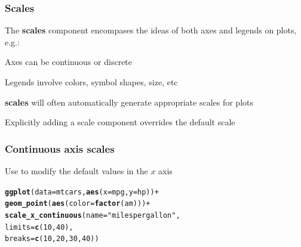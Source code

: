 \documentclass[12pt]{beamer}\usepackage[]{graphicx}\usepackage[]{color}
\makeatletter
\newcommand{\hlnum}[1]{\textcolor[rgb]{0.686,0.059,0.569}{#1}}%
\newcommand{\hlstr}[1]{\textcolor[rgb]{0.192,0.494,0.8}{#1}}%
\newcommand{\hlopt}[1]{\textcolor[rgb]{0,0,0}{#1}}%
\newcommand{\hlstd}[1]{\textcolor[rgb]{0.345,0.345,0.345}{#1}}%
\newcommand{\hlkwc}[1]{\textcolor[rgb]{0.333,0.667,0.333}{#1}}%
\newcommand{\hlkwd}[1]{\textcolor[rgb]{0.737,0.353,0.396}{\textbf{#1}}}%
\newenvironment{kframe}{%
 \def\at@end@of@kframe{}%
 \ifinner\ifhmode%
  \def\at@end@of@kframe{\end{minipage}}%
  \begin{minipage}{\columnwidth}%
 \fi\fi%
 \def\FrameCommand##1{\hskip\@totalleftmargin \hskip-\fboxsep
 \colorbox{shadecolor}{##1}\hskip-\fboxsep
     \hskip-\linewidth \hskip-\@totalleftmargin \hskip\columnwidth}%
 \MakeFramed {\advance\hsize-\width
   \@totalleftmargin\z@ \linewidth\hsize
   \@setminipage}}%
 {\par\unskip\endMakeFramed%
 \at@end@of@kframe}
\newenvironment{knitrout}{}{} %
\makeatother
\begin{document}

\begin{frame}
\frametitle{Scales}

\bi
  \item The \textbf{scales} component encompases the ideas of both axes and legends on plots, e.g.:
  \item Axes can be continuous or discrete
  \item Legends involve colors, symbol shapes, size, etc
  \bi
    \item {}
    \item {}
    \item {}
  \ei
  \item \textbf{scales} will often automatically generate appropriate scales for plots
  \item Explicitly adding a scale component overrides the default scale
\ei

\end{frame}


\begin{frame}[fragile]
\frametitle{Continuous axis scales}
Use  to modify the default values in the $x$ axis
\begin{knitrout}\footnotesize
{}\color{fgcolor}\begin{kframe}
\begin{alltt}
\hlkwd{ggplot}\hlstd{(}\hlkwc{data} \hlstd{= mtcars,} \hlkwd{aes}\hlstd{(}\hlkwc{x} \hlstd{= mpg,} \hlkwc{y} \hlstd{= hp))} \hlopt{+}
  \hlkwd{geom_point}\hlstd{(}\hlkwd{aes}\hlstd{(}\hlkwc{color} \hlstd{=} \hlkwd{factor}\hlstd{(am)))} \hlopt{+}
  \hlkwd{scale_x_continuous}\hlstd{(}\hlkwc{name} \hlstd{=} \hlstr{"miles per gallon"}\hlstd{,}
                     \hlkwc{limits} \hlstd{=} \hlkwd{c}\hlstd{(}\hlnum{10}\hlstd{,} \hlnum{40}\hlstd{),}
                     \hlkwc{breaks} \hlstd{=} \hlkwd{c}\hlstd{(}\hlnum{10}\hlstd{,} \hlnum{20}\hlstd{,} \hlnum{30}\hlstd{,} \hlnum{40}\hlstd{))}
\end{alltt}
\end{kframe}
\end{knitrout}
\end{frame}

\end{document}
